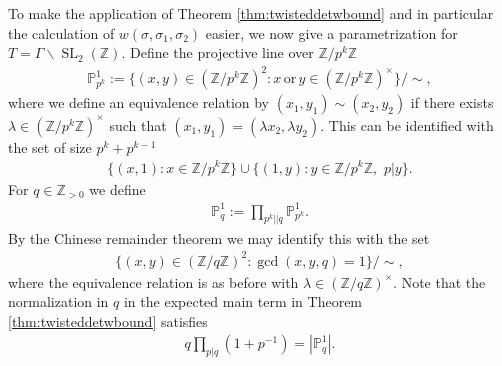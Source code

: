 \documentclass[12pt]{amsart}
\theoremstyle{definition}
\theoremstyle{remark}
\numberwithin{equation}{section}
\newcommand{\Z}{{\mathbb Z}}
\newcommand{\1}{{\mathbf 1}}
\newcommand{\SL}{\operatorname{SL}_2}
\begin{document}
To make the application of Theorem \ref{thm:twisteddetwbound} and in particular the calculation of $w(\sigma,\sigma_1,\sigma_2)$ easier, we now give a parametrization for $T = \Gamma \backslash \SL(\Z)$. Define the projective line over $\Z/p^k \Z$ 
\begin{align*}
    \mathbb{P}_{p^k}^{1} := \{(x,y) \in (\Z/p^k \Z)^2: x \, \text{or} \, y \in  (\Z/p^k \Z)^{\times}\} / \sim,
\end{align*}
where we define an equivalence relation by $(x_1,y_1) \sim (x_2,y_2)$ if there exists $\lambda \in (\Z/p^k \Z)^\times$ such that $(x_1,y_1) =  (\lambda x_2,\lambda y_2)$. This can be identified with the set of size $p^k+p^{k-1}$
\begin{align*}
    \{(x,1): x \in \Z/p^k \Z \} \cup   \{(1,y): y \in \Z/p^k \Z, \,\, p |y \}.
\end{align*}
For $q \in \Z_{>0}$ we define
\begin{align*}
     \mathbb{P}_{q}^{1} := \prod_{p^k||q}  \mathbb{P}_{p^k}^{1}.
\end{align*}
By the Chinese remainder theorem we may identify this with the set
\begin{align*}
      \{(x,y) \in (\Z/q \Z)^2: \gcd(x,y,q)=1\} / \sim,
\end{align*}
where the equivalence relation is as before with $ \lambda \in (\Z / q \Z)^\times$.
Note that the normalization in $q$ in the expected main term  in Theorem \ref{thm:twisteddetwbound} satisfies
\begin{align*}
    q \prod_{p | q} (1+p^{-1}) = | \mathbb{P}_{q}^{1}|.
\end{align*}
\end{document}
